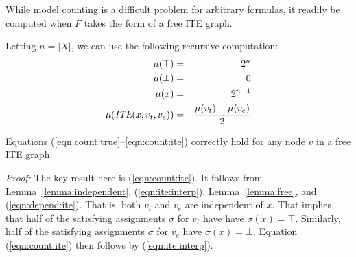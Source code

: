 \documentclass{llncs}
\newcommand{\tautology}{\top}
\newcommand{\nil}{\bot}
\newcommand{\ite}{\mbox{\it ITE}}
\newcommand{\interp}{\sigma}
\newcommand{\mcount}{\mu}
\begin{document}
While model counting is a difficult problem for arbitrary
formulas, it readily be computed when $F$ takes the form of a free
ITE graph.

Letting $n = |X|$, we can use the following recursive computation:
\begin{eqnarray}
\mcount(\tautology) & = & 2^{n} \label{eqn:count:true}\\
\mcount(\nil) & = & 0 \label{eqn:count:false}\\
\mcount(x) & = & 2^{n-1} \label{eqn:count:variable}\\
\mcount(\ite(x, v_t, v_e)) & = & \frac{\mcount(v_t) + \mcount(v_e)}{2} \label{eqn:count:ite}
\end{eqnarray}  

\begin{theorem}
Equations (\ref{eqn:count:true}--\ref{eqn:count:ite}) correctly hold for any node $v$ in a free ITE graph.
\end{theorem}  
\noindent
{\em Proof:} The key result here is (\ref{eqn:count:ite}).  It follows
from Lemma~\ref{lemma:independent}, (\ref{eqn:ite:interp}),
Lemma~\ref{lemma:free}, and (\ref{eqn:depend:ite}).  That is, both
$v_t$ and $v_e$ are independent of $x$.  That implies that half of the
satisfying assignments $\interp$ for $v_t$ have have $\interp(x) =
\tautology$.  Similarly, half of the satisfying assignments $\interp$
for $v_e$ have $\interp(x) = \nil$.  Equation (\ref{eqn:count:ite}) then follows by (\ref{eqn:ite:interp}).


\end{document}
